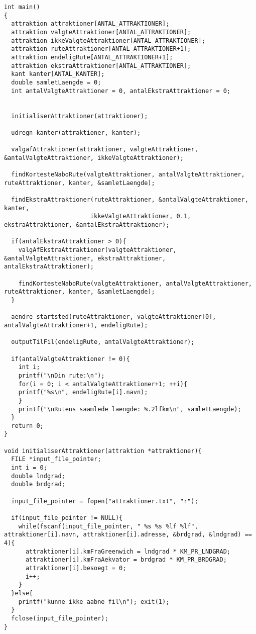 \begin{lstlisting}
int main()
{
  attraktion attraktioner[ANTAL_ATTRAKTIONER];
  attraktion valgteAttraktioner[ANTAL_ATTRAKTIONER];
  attraktion ikkeValgteAttraktioner[ANTAL_ATTRAKTIONER];
  attraktion ruteAttraktioner[ANTAL_ATTRAKTIONER+1];
  attraktion endeligRute[ANTAL_ATTRAKTIONER+1];
  attraktion ekstraAttraktioner[ANTAL_ATTRAKTIONER];
  kant kanter[ANTAL_KANTER];
  double samletLaengde = 0;
  int antalValgteAttraktioner = 0, antalEkstraAttraktioner = 0;


  initialiserAttraktioner(attraktioner);

  udregn_kanter(attraktioner, kanter);

  valgafAttraktioner(attraktioner, valgteAttraktioner, &antalValgteAttraktioner, ikkeValgteAttraktioner);

  findKortesteNaboRute(valgteAttraktioner, antalValgteAttraktioner, ruteAttraktioner, kanter, &samletLaengde);

  findEkstraAttraktioner(ruteAttraktioner, &antalValgteAttraktioner, kanter, 
                        ikkeValgteAttraktioner, 0.1, ekstraAttraktioner, &antalEkstraAttraktioner);

  if(antalEkstraAttraktioner > 0){
    valgAfEkstraAttraktioner(valgteAttraktioner, &antalValgteAttraktioner, ekstraAttraktioner, antalEkstraAttraktioner);

    findKortesteNaboRute(valgteAttraktioner, antalValgteAttraktioner, ruteAttraktioner, kanter, &samletLaengde);
  }

  aendre_startsted(ruteAttraktioner, valgteAttraktioner[0], antalValgteAttraktioner+1, endeligRute);

  outputTilFil(endeligRute, antalValgteAttraktioner);

  if(antalValgteAttraktioner != 0){
    int i;
    printf("\nDin rute:\n");
    for(i = 0; i < antalValgteAttraktioner+1; ++i){
    printf("%s\n", endeligRute[i].navn);
    }
    printf("\nRutens saamlede laengde: %.2lfkm\n", samletLaengde);
  }
  return 0;
}

void initialiserAttraktioner(attraktion *attraktioner){
  FILE *input_file_pointer;
  int i = 0;
  double lndgrad;
  double brdgrad;

  input_file_pointer = fopen("attraktioner.txt", "r");

  if(input_file_pointer != NULL){
    while(fscanf(input_file_pointer, " %s %s %lf %lf", attraktioner[i].navn, attraktioner[i].adresse, &brdgrad, &lndgrad) == 4){
      attraktioner[i].kmFraGreenwich = lndgrad * KM_PR_LNDGRAD;
      attraktioner[i].kmFraAekvator = brdgrad * KM_PR_BRDGRAD;
      attraktioner[i].besoegt = 0;
      i++;
    }
  }else{
    printf("kunne ikke aabne fil\n"); exit(1);
  }
  fclose(input_file_pointer);
} 


\end{lstlisting}

